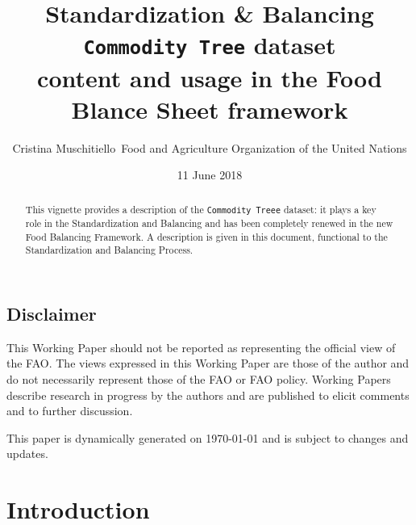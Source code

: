 \documentclass[]{article}
\title{Standardization \& Balancing\\
\texttt{Commodity\ Tree} dataset\\
content and usage in the Food Blance Sheet framework}
\author{Cristina Muschitiello~Food and Agriculture Organization of the United
Nations}
\date{11 June 2018}
\begin{document}
\maketitle
\begin{abstract}
This vignette provides a description of the \texttt{Commodity\ Treee}
dataset: it plays a key role in the Standardization and Balancing and
has been completely renewed in the new Food Balancing Framework. A
description is given in this document, functional to the Standardization
and Balancing Process.
\end{abstract}

{
\setcounter{tocdepth}{4}
\tableofcontents
}
\newpage

\listoftables

\listoffigures

\subsection*{Disclaimer}\label{disclaimer}

This Working Paper should not be reported as representing the official
view of the FAO. The views expressed in this Working Paper are those of
the author and do not necessarily represent those of the FAO or FAO
policy. Working Papers describe research in progress by the authors and
are published to elicit comments and to further discussion.

This paper is dynamically generated on \today{} and is subject to
changes and updates.

\newpage

\section{Introduction}\label{introduction}
\end{document}
